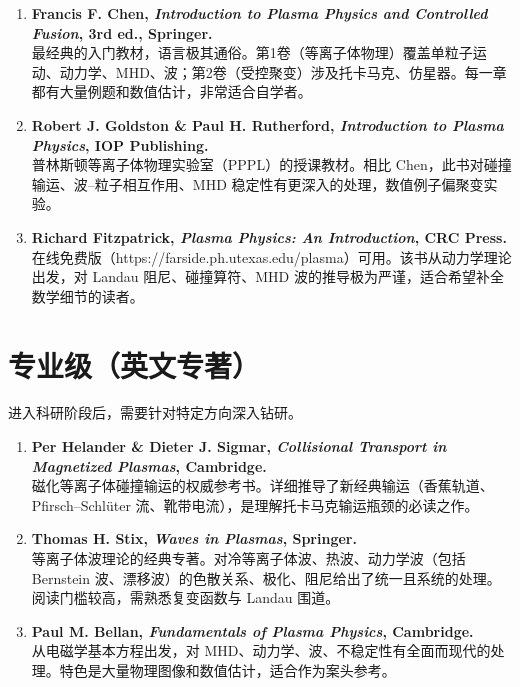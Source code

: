 \begin{enumerate}
\item \textbf{Francis F. Chen, \textit{Introduction to Plasma Physics and Controlled Fusion}, 3rd ed., Springer.}\\
最经典的入门教材，语言极其通俗。第1卷（等离子体物理）覆盖单粒子运动、动力学、MHD、波；第2卷（受控聚变）涉及托卡马克、仿星器。每一章都有大量例题和数值估计，非常适合自学者。

\item \textbf{Robert J. Goldston \& Paul H. Rutherford, \textit{Introduction to Plasma Physics}, IOP Publishing.}\\
普林斯顿等离子体物理实验室（PPPL）的授课教材。相比 Chen，此书对碰撞输运、波--粒子相互作用、MHD 稳定性有更深入的处理，数值例子偏聚变实验。

\item \textbf{Richard Fitzpatrick, \textit{Plasma Physics: An Introduction}, CRC Press.}\\
在线免费版（https://farside.ph.utexas.edu/plasma）可用。该书从动力学理论出发，对 Landau 阻尼、碰撞算符、MHD 波的推导极为严谨，适合希望补全数学细节的读者。
\end{enumerate}


\section{专业级（英文专著）}

进入科研阶段后，需要针对特定方向深入钻研。

\begin{enumerate}
\item \textbf{Per Helander \& Dieter J. Sigmar, \textit{Collisional Transport in Magnetized Plasmas}, Cambridge.}\\
磁化等离子体碰撞输运的权威参考书。详细推导了新经典输运（香蕉轨道、 Pfirsch--Schlüter 流、靴带电流），是理解托卡马克输运瓶颈的必读之作。

\item \textbf{Thomas H. Stix, \textit{Waves in Plasmas}, Springer.}\\
等离子体波理论的经典专著。对冷等离子体波、热波、动力学波（包括 Bernstein 波、漂移波）的色散关系、极化、阻尼给出了统一且系统的处理。阅读门槛较高，需熟悉复变函数与 Landau 围道。

\item \textbf{Paul M. Bellan, \textit{Fundamentals of Plasma Physics}, Cambridge.}\\
从电磁学基本方程出发，对 MHD、动力学、波、不稳定性有全面而现代的处理。特色是大量物理图像和数值估计，适合作为案头参考。
\end{enumerate}



